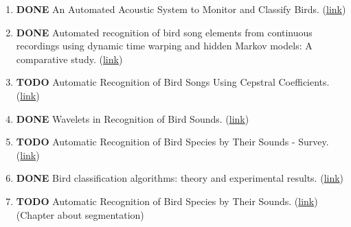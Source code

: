 \documentclass[11pt]{article}
\begin{document}
\begin{enumerate}
\label{sec:org244dadf}
\item {\bfseries\sffamily DONE} An Automated Acoustic System to Monitor and Classify Birds. (\href{http://download.springer.com/static/pdf/296/art\%253A10.1155\%252FASP\%252F2006\%252F96706.pdf?originUrl=http\%3A\%2F\%2Flink.springer.com\%2Farticle\%2F10.1155\%2FASP\%2F2006\%2F96706\&token2=exp=1491790536\~acl=\%2Fstatic\%2Fpdf\%2F296\%2Fart\%25253A10.1155\%25252FASP\%25252F2006\%25252F96706.pdf\%3ForiginUrl\%3Dhttp\%253A\%252F\%252Flink.springer.com\%252Farticle\%252F10.1155\%252FASP\%252F2006\%252F96706*\~hmac=d1377141fd9b5b444d1e9a8b5ecdb1c15c92f39a2b1695cf31f6da6a4cfb187a}{link})
\label{sec:org03eddd7}
\item {\bfseries\sffamily DONE} Automated recognition of bird song elements from continuous recordings using dynamic time warping and hidden Markov models: A comparative study. (\href{http://asa.scitation.org/doi/abs/10.1121/1.421364}{link})
\label{sec:orgcef2ec4}
\item {\bfseries\sffamily TODO} Automatic Recognition of Bird Songs Using Cepstral Coefficients. (\href{https://www.researchgate.net/profile/Chang-Hsing\_Lee/publication/253259227\_Automatic\_Recognition\_of\_Bird\_Songs\_Using\_Cepstral\_Coefficients/links/53ede4db0cf26b9b7dc63033.pdf}{link})
\label{sec:orgb8a3cc5}
\item {\bfseries\sffamily DONE} Wavelets in Recognition of Bird Sounds. (\href{http://s3.amazonaws.com/academia.edu.documents/40038976/560524cd08ae5e8e3f31325b.pdf20151115-68247-1reydjr.pdf?AWSAccessKeyId=AKIAIWOWYYGZ2Y53UL3A\&Expires=1491793894\&Signature=Ay\%2FrPHzyuWr55BessSwGTM\%2F3doE\%3D\&response-content-disposition=inline\%3B\%20filename\%3DWavelets\_in\_Recognition\_of\_Bird\_Sounds.pdf}{link})
\label{sec:orgef53fa9}
\item {\bfseries\sffamily TODO} Automatic Recognition of Bird Species by Their Sounds - Survey. (\href{http://legacy.spa.aalto.fi/research/avesound/pubs/fagerlund\_mst.pdf}{link})
\label{sec:org92ae70d}
\item {\bfseries\sffamily DONE} Bird classification algorithms: theory and experimental results. (\href{https://www.researchgate.net/profile/Chiman\_Kwan/publication/4088075\_Bird\_classification\_algorithms\_theory\_and\_experimental\_results/links/0deec5304cc050b8f7000000.pdf}{link})
\label{sec:orga42cf48}
\item {\bfseries\sffamily TODO} Automatic Recognition of Bird Species by Their Sounds. (\href{http://legacy.spa.aalto.fi/research/avesound/pubs/fagerlund\_mst.pdf}{link}) (Chapter about segmentation)
\label{sec:org6ed1b60}
\end{enumerate}
\end{document}
